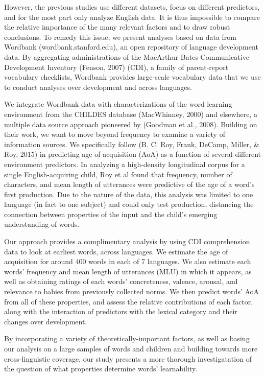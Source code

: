 \documentclass[10pt, letterpaper]{article}
\begin{document}
However, the previous studies use different datasets, focus on different
predictors, and for the most part only analyze English data. It is thus
impossible to compare the relative importance of the many relevant
factors and to draw robust conclusions. To remedy this issue, we present
analyses based on data from Wordbank (wordbank.stanford.edu), an open
repository of language development data. By aggregating administrations
of the MacArthur-Bates Communicative Development Inventory (Fenson,
2007) (CDI), a family of parent-report vocabulary checklists, Wordbank
provides large-scale vocabulary data that we use to conduct analyses
over development and across languages.

We integrate Wordbank data with characterizations of the word learning
environment from the CHILDES database (MacWhinney, 2000) and elsewhere,
a multiple data source approach pioneered by (Goodman et al., 2008).
Building on their work, we want to move beyond frequency to examine a
variety of information sources. We specifically follow (B. C. Roy,
Frank, DeCamp, Miller, \& Roy, 2015) in predicting age of acquisition
(AoA) as a function of several different environment predictors. In
analyzing a high-density longitudinal corpus for a single
English-acquiring child, Roy et al found that frequency, number of
characters, and mean length of utterances were predictive of the age of
a word's first production. Due to the nature of the data, this analysis
was limited to one language (in fact to one subject) and could only test
production, distancing the connection between properties of the input
and the child's emerging understanding of words.

Our approach provides a complimentary analysis by using CDI
comprehension data to look at earliest words, across languages. We
estimate the age of acquisition for around 400 words in each of 7
languages. We also estimate each words' frequency and mean length of
utterances (MLU) in which it appears, as well as obtaining ratings of
each words' concreteness, valence, arousal, and relevance to babies from
previously collected norms. We then predict words' AoA from all of these
properties, and assess the relative contributions of each factor, along
with the interaction of predictors with the lexical category and their
changes over development.

By incorporating a variety of theoretically-important factors, as well
as basing our analysis on a large samples of words and children and
building towards more cross-linguistic coverage, our study presents a
more thorough investigatation of the question of what properties
determine words' learnability.
\end{document}
